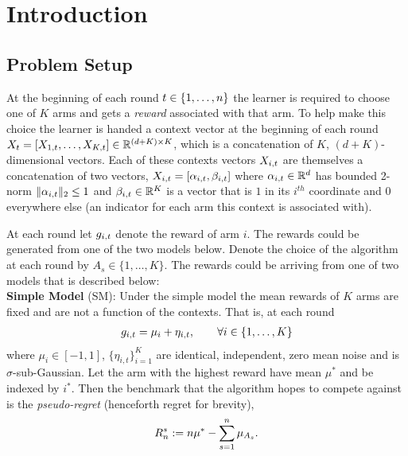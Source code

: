 \section{Introduction}
 
\subsection{Problem Setup}

At the beginning of each round $t \in \{1,\ldots, n\}$ the learner is required to choose one of $K$ arms and gets a \emph{reward} associated with that arm. To help make this choice the learner is handed a context vector at the beginning of each round $X_{t} = [X_{1,t},\ldots,X_{K,t}] \in \mathbb{R}^{(d+K)\times K}$, which is a concatenation of $K$, $(d+K)$-dimensional vectors. Each of these contexts vectors $X_{i,t}$ are themselves a concatenation of two vectors, $X_{i,t} = [\alpha_{i,t},  \beta_{i,t}]$ where $\alpha_{i,t} \in \mathbb{R}^d$ has bounded 2-norm $\lVert \alpha_{i,t} \rVert_2 \le 1$ and $\beta_{i,t} \in \mathbb{R}^K$ is a vector that is $1$ in its $i^{th}$ coordinate and 0 everywhere else (an indicator for each arm this context is associated with).

At each round let $g_{i,t}$ denote the reward of arm $i$. The rewards could be generated from one of the two models below. Denote the choice of the algorithm at each round by $A_s \in\{1,\ldots,K\}$. The rewards could be arriving from one of two models that is described below:\\

\textbf{Simple Model} (SM): Under the simple model the mean rewards of $K$ arms are fixed and are not a function of the contexts. That is, at each round
\begin{align*}
    g_{i,t} = \mu_{i} + \eta_{i,t},\qquad  \forall i \in \{1,\ldots, K\}
    \end{align*}
where $\mu_i \in [-1,1]$, $\{\eta_{i,t}\}_{i=1}^K$ are identical, independent, zero mean noise and is $\sigma$-sub-Gaussian. Let the arm with the highest reward have mean $\mu^*$ and be indexed by $i^*$. Then the benchmark that the algorithm hopes to compete against is the \emph{pseudo-regret} (henceforth regret for brevity),
\begin{align}
    \label{def:expectedpseudoregret}
    R^s_{n} := n \mu^* -\sum_{s = 1}^n \mu_{A_s} .
\end{align} 

